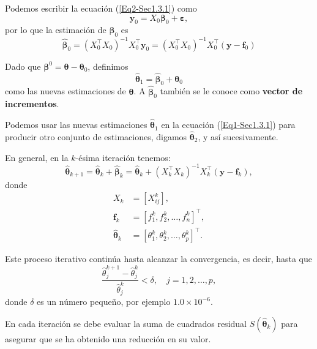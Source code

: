 \documentclass[aspectratio = 169, spanish]{beamer}
\begin{document}
\begin{frame}
    Podemos escribir la ecuación (\ref{Eq2-Sec1.3.1}) como
\[
\bm{y}_{0} = {X}_0 \bm{\beta}_{0} + \bm{\varepsilon},
\]
por lo que la estimación de $\bm{\beta}_{0}$ es
\begin{equation}\label{Eq-Incrementos-Gauss-Newton}
    \bm{\hat{\beta}}_0 = ({X}_0^\top {X}_0)^{-1} {X}_0^\top \bm{y}_0 = ({X}_0^\top {X}_0)^{-1} {X}_0^\top (\bm{y} - \bm{f}_0)
\end{equation}

Dado que $\bm{\beta}^{0} = \bm{\theta} - \bm{\theta}_{0}$, definimos
\[
\bm{\hat{\theta}}_1 = \bm{\hat{\beta}}_0 + \bm{\theta}_0
\]
como las nuevas estimaciones de $\bm{\theta}$. A $\bm{\hat{\beta}}_0$ también se le conoce como \textbf{vector de incrementos}.
\end{frame}

\begin{frame}
    Podemos usar las nuevas estimaciones $\bm{\hat{\theta}}_1$ en la ecuación (\ref{Eq1-Sec1.3.1}) para producir otro conjunto de estimaciones, digamos $\bm{\hat{\theta}}_2$, y así sucesivamente.

En general, en la $k$-ésima iteración tenemos:
\begin{equation}\label{Eq-Incrementos.Sec1.3.1}
    \bm{\hat{\theta}}_{k+1} = \bm{\hat{\theta}}_k + \bm{\hat{\beta}}_k = \bm{\hat{\theta}}_k + ({X}_k^\top {X}_k)^{-1} {X}_k^\top (\bm{y} - \bm{f}_k),
\end{equation}
donde
\[
\begin{split}
    {X}_k &= [X_{ij}^k],\\
    \bm{f}_k &= {[f_1^k, f_2^k, \ldots, f_n^k]}^\top,\\
    \bm{\hat{\theta}}_k &= {[\theta_{1}^k, \theta_{2}^k, \ldots, \theta_{p}^k]}^\top.
\end{split}
\]
\end{frame}

\begin{frame}
    Este proceso iterativo continúa hasta alcanzar la convergencia, es decir, hasta que
\[
\frac{\hat{\theta}_{j}^{k+1} - \hat{\theta}_{j}^{k}}{\hat{\theta}_{j}^{k}} < \delta, \quad j = 1, 2, \ldots, p,
\]
donde $\delta$ es un número pequeño, por ejemplo $1.0 \times 10^{-6}$. 

En cada iteración se debe evaluar la suma de cuadrados residual $S(\bm{\hat{\theta}}_k)$ para asegurar que se ha obtenido una reducción en su valor.
\end{frame}
\end{document}
